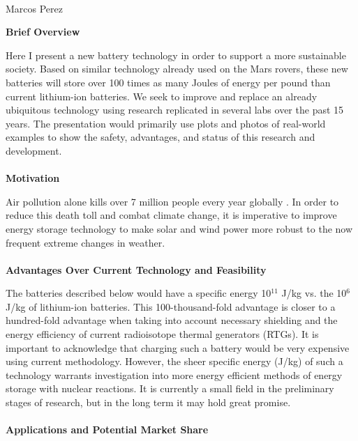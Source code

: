\documentclass[12pt]{article}
\begin{document}
\begin{center}
   \\
   Marcos Perez
\end{center}
\begin{comment}
    What do I want them to walk away with? \\
    Nuclear reactions 
\end{comment}
\textbf{Brief Overview}\par
Here I present a new battery technology in order to support a more sustainable society. Based on similar technology already used on the Mars rovers, these new batteries will store over 100 times as many Joules of energy per pound than current lithium-ion batteries. We seek to improve and replace an already ubiquitous technology using research replicated in several labs over the past 15 years. The presentation would primarily use plots and photos of real-world examples to show the safety, advantages, and status of this research and development. 
\\ \\ \textbf{Motivation}\par
Air pollution alone kills over 7 million people every year globally \cite{mannucci_novel_2019, noauthor_compendium_nodate, nansai_consumption_2021}. 
In order to reduce this death toll and combat climate change, it is imperative to improve energy storage technology to make solar and wind power more robust to the now frequent extreme changes in weather.
\\ \\ \textbf{Advantages Over Current Technology and Feasibility}\par
The batteries described below would have a specific energy 10$^{11}$ J/kg vs. the 10$^6$ J/kg of lithium-ion batteries. This 100-thousand-fold advantage is closer to a hundred-fold advantage when taking into account necessary shielding and the energy efficiency of current radioisotope thermal generators (RTGs). It is important to acknowledge that charging such a battery would be very expensive using current methodology. However, the sheer specific energy (J/kg) of such a technology warrants investigation into more energy efficient methods of energy storage with nuclear reactions. It is currently a small field in the preliminary stages of research, but in the long term it may hold great promise.
\\ \\ \textbf{Applications and Potential Market Share}\par 
\end{document}
